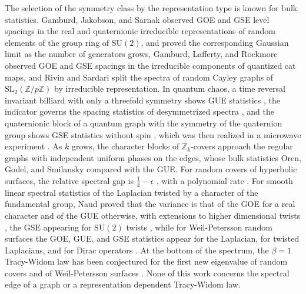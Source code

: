 \documentclass[12pt,oneside,english]{amsart}
\numberwithin{equation}{section}
\numberwithin{figure}{section}
\numberwithin{table}{section}
\theoremstyle{plain}
\numberwithin{thm}{section}
\theoremstyle{plain}
\theoremstyle{plain}
\theoremstyle{plain}
\theoremstyle{definition}
\theoremstyle{definition}
\theoremstyle{definition}
\theoremstyle{remark}
\begin{document}
The selection of the symmetry class by the representation type is
known for bulk statistics. Gamburd, Jakobson, and Sarnak \cite{GamburdJakobsonSarnak1999}
observed GOE and GSE level spacings in the real and quaternionic irreducible
representations of random elements of the group ring of $\mathrm{SU}(2)$,
and proved the corresponding Gaussian limit as the number of generators
grows, Gamburd, Lafferty, and Rockmore \cite{GamburdLaffertyRockmore2003}
observed GOE and GSE spacings in the irreducible components of quantized
cat maps, and Rivin and Sardari \cite{RivinSardari2019} split the
spectra of random Cayley graphs of $\mathrm{SL}_{2}(\mathbb{Z}/p\mathbb{Z})$
by irreducible representation. In quantum chaos, a time reversal invariant
billiard with only a threefold symmetry shows GUE statistics \cite{LeyvrazSchmitSeligman1996,KeatingRobbins1997},
the indicator governs the spacing statistics of desymmetrized spectra
\cite{JoynerMullerSieber2012}, and the quaternionic block of a quantum
graph with the symmetry of the quaternion group shows GSE statistics
without spin \cite{JoynerMullerSieber2014}, which was then realized
in a microwave experiment \cite{RehemanjiangEtAl2016}. As $k$ grows,
the character blocks of $\mathbb{Z}_{k}$-covers approach the regular
graphs with independent uniform phases on the edges, whose bulk statistics
Oren, Godel, and Smilansky \cite{OrenGodelSmilansky2009,OrenSmilansky2010}
compared with the GUE. For random covers of hyperbolic surfaces, the
relative spectral gap is $\frac{1}{4}-\epsilon$ \cite{MageeNaudPuder2022,HideMagee2023,MageePuderVanHandel2025},
with a polynomial rate \cite{HideMaceraThomas2025Covers}. For smooth
linear spectral statistics of the Laplacian twisted by a character
of the fundamental group, Naud \cite{Naud2026} proved that the variance
is that of the GOE for a real character and of the GUE otherwise,
with extensions to higher dimensional twists \cite{Moy2024,Maoz2026},
the GSE appearing for $\mathrm{SU}(2)$ twists \cite{Moy2024}, while
for Weil-Petersson random surfaces the GOE, GUE, and GSE statistics
appear for the Laplacian, for twisted Laplacians, and for Dirac operators
\cite{Rudnick2023,MarklofMonk2024}. At the bottom of the spectrum,
the $\beta=1$ Tracy-Widom law has been conjectured for the first new
eigenvalue of random covers and of Weil-Petersson surfaces \cite{HideMaceraThomas2025Covers,HideMaceraThomas2025WP}.
None of this work concerns the spectral edge of a graph or a representation
dependent Tracy-Widom law.
\end{document}
